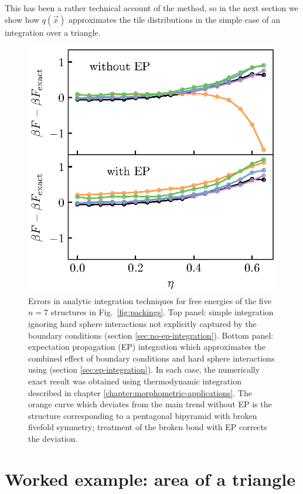 \documentclass[11pt,twoside]{report}
\begin{document}
This has been a rather technical account of the method, so in the next section we show how $q(\vec{x})$ approximates the tile distributions in the simple case of an integration over a triangle.

\begin{figure}
  \includegraphics[width=0.9\linewidth,outer]{ep-n7}
  \caption[Errors in analytical integration techniques for the free energies of $n=7$ structures]{
    Errors in analytic integration techniques for free energies of the five $n = 7$ structures in Fig.\ \ref{fig:packings}.
    Top panel: simple integration ignoring hard sphere interactions not explicitly captured by the boundary conditions (section \ref{sec:no-ep-integration}).
    Bottom panel: expectation propagation (EP) integration which approximates the combined effect of boundary conditions and hard sphere interactions using (section \ref{sec:ep-integration}).
    In each case, the numerically exact result was obtained using thermodynamic integration described in chapter \ref{chapter:morphometric-applications}.
    The orange curve which deviates from the main trend without EP is the structure corresponding to a pentagonal bipyramid with broken fivefold symmetry; treatment of the broken bond with EP corrects the deviation.
  }
  \label{fig:ep-n7}
\end{figure}

\section{Worked example: area of a triangle}
\label{sec:ep-worked-example}
\end{document}
